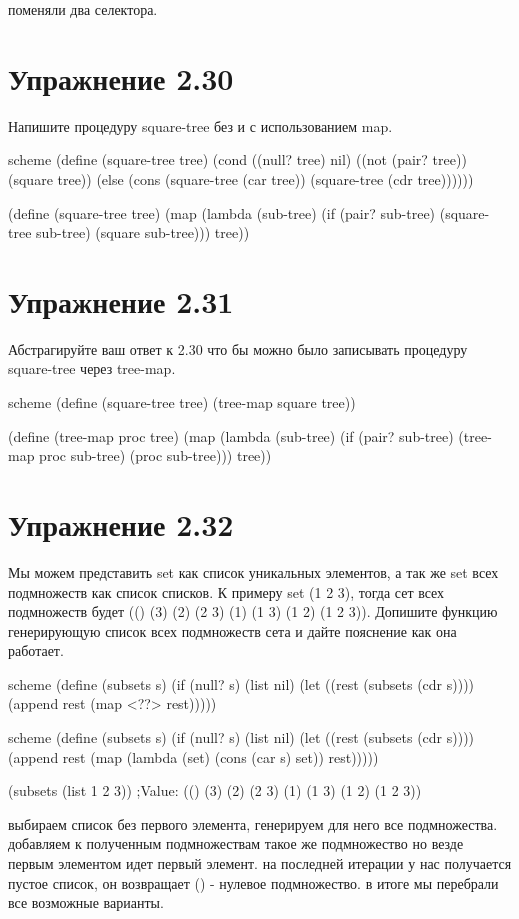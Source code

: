 поменяли два селектора.


\chapter{Упражнение 2.30}

Напишите процедуру square-tree без и с использованием map.

\begin{codelisting}{scheme}
(define (square-tree tree)
  (cond ((null? tree) nil)
        ((not (pair? tree)) (square tree))
        (else (cons (square-tree (car tree))
                    (square-tree (cdr tree))))))

(define (square-tree tree)
  (map (lambda (sub-tree)
         (if (pair? sub-tree)
             (square-tree sub-tree)
             (square sub-tree)))
       tree))
\end{codelisting}

\chapter{Упражнение 2.31}

Абстрагируйте ваш ответ к 2.30 что бы можно было записывать процедуру square-tree через tree-map.

\begin{codelisting}{scheme}
(define (square-tree tree) (tree-map square tree))


(define (tree-map proc tree)
  (map (lambda (sub-tree)
         (if (pair? sub-tree)
             (tree-map proc sub-tree)
             (proc sub-tree)))
       tree))
\end{codelisting}

\chapter{Упражнение 2.32}

Мы можем представить set как список уникальных элементов, а так же set всех подмножеств как список списков. К примеру set (1 2 3), тогда сет всех подмножеств будет (() (3) (2) (2 3) (1) (1 3) (1 2) (1 2 3)). Допишите функцию генерирующую список всех подмножеств сета и дайте пояснение как она работает.

\begin{codelisting}{scheme}
(define (subsets s)
  (if (null? s)
      (list nil)
      (let ((rest (subsets (cdr s))))
        (append rest (map <??> rest)))))
\end{codelisting}

\begin{codelisting}{scheme}
(define (subsets s)
  (if (null? s)
      (list nil)
      (let ((rest (subsets (cdr s))))
        (append rest (map (lambda (set) (cons (car s) set)) rest)))))

(subsets (list 1 2 3))
;Value: (() (3) (2) (2 3) (1) (1 3) (1 2) (1 2 3))
\end{codelisting}

выбираем список без первого элемента, генерируем для него все подмножества. добавляем к полученным подмножествам такое же подмножество но везде первым элементом идет первый элемент.
на последней итерации у нас получается пустое список, он возвращает () - нулевое подмножество. в итоге мы перебрали все возможные варианты.